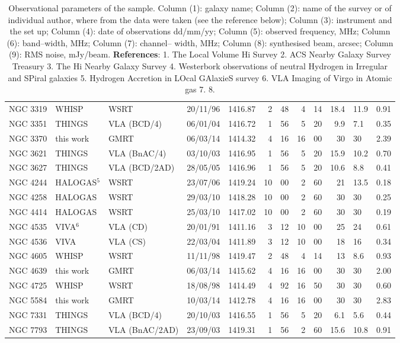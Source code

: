 \documentclass[usenatbib,useAMS]{mnras}
\begin{document}
\begin{table}
\begin{tabular}{lllllr@{.}lr@{.}lr@{$\times$}ll}
NGC 3319 & WHISP        & WSRT	         & 20/11/96 & 1416.87 &  2 & 48 & 4& 14 & 18.4&11.9	&0.91\\
NGC 3351 & THINGS       & VLA (BCD/4)    & 06/01/04 & 1416.72 &  1 & 56 & 5& 20 &  9.9&7.1	&0.35\\
NGC 3370 & this work    & GMRT           & 06/03/14 & 1414.32 &  4 & 16 &16& 00 & 30&30	&2.39	\\
NGC 3621 & THINGS       & VLA (BnAC/4)   & 03/10/03 & 1416.95 &  1 & 56 & 5& 20 & 15.9&10.2&0.70\\
NGC 3627 & THINGS       & VLA (BCD/2AD)  & 28/05/05 & 1416.96 &  1 & 56 & 5& 20 & 10.6&8.8&0.41\\
NGC 4244 & HALOGAS$^{5}$& WSRT           & 23/07/06 & 1419.24 & 10 & 00 & 2& 60 & 21&13.5	&0.18\\
NGC 4258 & HALOGAS      & WSRT	         & 29/03/10 & 1418.28 & 10 & 00 & 2& 60 & 30&30	&0.25\\
NGC 4414 & HALOGAS      & WSRT           & 25/03/10 & 1417.02 & 10 & 00 & 2& 60 & 30&30	&0.19\\
NGC 4535 & VIVA$^{6}$   & VLA (CD)       & 20/01/91 & 1411.16 &  3 & 12 &10& 00 & 25&24	&0.61\\
NGC 4536 & VIVA	        & VLA (CS)       & 22/03/04 & 1411.89 &  3 & 12 &10& 00 & 18&16	&0.34\\
NGC 4605 & WHISP        & WSRT	         & 11/11/98 & 1419.47 &  2 & 48 & 4& 14 & 13&8.6	&0.93\\
NGC 4639 & this work    & GMRT           & 06/03/14 & 1415.62 &  4 & 16 &16& 00 & 30&30	&2.00\\
NGC 4725 & WHISP        & WSRT	         & 18/08/98 & 1414.49 &  4 & 92 &16& 50 & 30&30	&0.60\\
NGC 5584 & this work    & GMRT           & 10/03/14 & 1412.78 &  4 & 16 &16& 00 & 30&30	&2.83\\
NGC 7331 & THINGS       & VLA (BCD/4)    & 20/10/03 & 1416.55 &  1 & 56 & 5& 20 &  6.1&5.6	&0.44\\
NGC 7793 & THINGS       & VLA (BnAC/2AD) & 23/09/03 & 1419.31 &  1 & 56 & 2& 60 & 15.6&10.8	&0.91\\
\hline
\end{tabular}
\caption{Observational parameters of the sample.
Column (1): galaxy name;
Column (2): name of the survey or of individual author, where from the data were taken (see the reference below); 
Column (3): instrument and the set up;
Column (4): date of observations dd/mm/yy;
Column (5): observed frequency, MHz;
Column (6): band--width, MHz;
Column (7): channel-- width, MHz;
Column (8): synthesised beam, arcsec;
Column (9): RMS noise, mJy/beam.
\textbf{References}: 1. The Local Volume H{\sc i} Survey \citep{lvhis} 2. ACS Nearby Galaxy Survey Treasury \citep{angst} 3. The H{\sc i} Nearby Galaxy Survey \citep{things} 4. Westerbork observations of neutral Hydrogen in Irregular and SPiral galaxies \citep{whisp} 5. Hydrogen Accretion in LOcal GAlaxieS survey \citep{halogas} 6. VLA Imaging of Virgo in Atomic gas \citep{viva} 7. \citet{andromeda} 8.\citet{1365}
}
\label{tbl_obs}
\end{table}
\end{document}
